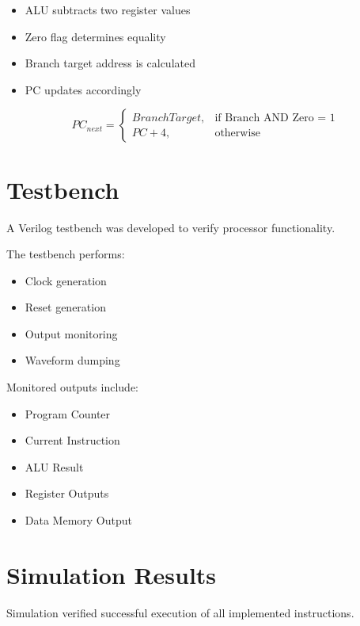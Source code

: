\documentclass[conference]{IEEEtran}
\begin{document}
\begin{itemize}
    \item ALU subtracts two register values
    \item Zero flag determines equality
    \item Branch target address is calculated
    \item PC updates accordingly
\end{itemize}

\[
PC_{next} =
\begin{cases}
BranchTarget, & \text{if Branch AND Zero = 1} \\
PC + 4, & \text{otherwise}
\end{cases}
\]


\section{Testbench}

A Verilog testbench was developed to verify processor functionality.

The testbench performs:

\begin{itemize}
    \item Clock generation
    \item Reset generation
    \item Output monitoring
    \item Waveform dumping
\end{itemize}

Monitored outputs include:

\begin{itemize}
    \item Program Counter
    \item Current Instruction
    \item ALU Result
    \item Register Outputs
    \item Data Memory Output
\end{itemize}


\section{Simulation Results}

Simulation verified successful execution of all implemented instructions.
\end{document}
